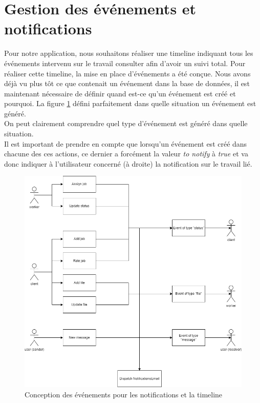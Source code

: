\documentclass[
    iai, %
    il, %
]{heig-tb}
\begin{document}
\section{Gestion des événements et notifications}
Pour notre application, nous souhaitons réaliser une timeline indiquant tous les événements intervenu sur le travail consulter afin d'avoir un suivi total. Pour réaliser cette timeline, la mise en place d'événements a été conçue. Nous avons déjà vu plus tôt ce que contenait un événement dans la base de données, il est maintenant nécessaire de définir quand est-ce qu'un événement est créé et pourquoi. La figure \ref{events-email-scenario.drawio} défini parfaitement dans quelle situation un événement est généré. \\
On peut clairement comprendre quel type d'événement est généré dans quelle situation. \\
Il est important de prendre en compte que lorsqu'un événement est créé dans chacune des ces actions, ce dernier a forcément la valeur \emph{to notify} à \emph{true} et va donc indiquer à l'utilisateur concerné (à droite) la notification sur le travail lié.

\begin{center}
    \begin{figure}
        \includegraphics[width=\textwidth]{./assets/figures/events-email-scenario.drawio.png}
        \caption{Conception des événements pour les notifications et la timeline \label{events-email-scenario.drawio}}
    \end{figure}
\end{center}
\end{document}
